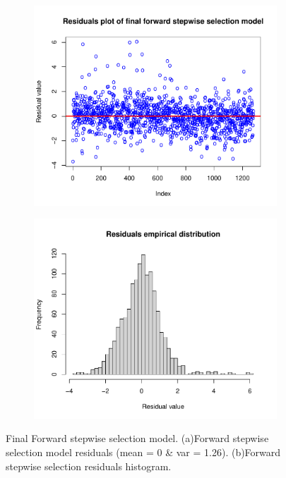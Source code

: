 \begin{figure}[H]
	\centering
	\begin{subfigure}{.5\textwidth}
		\centering
		\includegraphics[width=0.7\linewidth]{ImageFiles/Regression/Forward/ForwardFinalModelResiduals.pdf}
		\caption{}
		\label{fig:ForwardFinalModelResiduals}
	\end{subfigure}%
	\begin{subfigure}{.5\textwidth}
		\centering
		\includegraphics[width=0.7\linewidth]{ImageFiles/Regression/Forward/ForwardFinalModelResidualsDist.pdf}
		\caption{}
		\label{fig:ForwardFinalModelResidualsDist}
	\end{subfigure}
	\caption{Final Forward stepwise selection model. (a)Forward stepwise selection model residuals (mean = 0 \& var = 1.26). (b)Forward stepwise selection residuals histogram.}
	\label{fig:FinalFSSM}
\end{figure}

